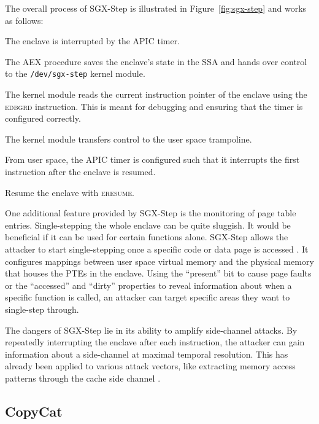\documentclass{llncs}
\begin{document}
The overall process of SGX-Step is illustrated in Figure~\ref{fig:sgx-step} and works as follows:
\begin{enumerate*}
  \item[\ding{172}]
    The enclave is interrupted by the APIC timer.
  \item[\ding{173}]
    The AEX procedure saves the enclave's state in the SSA
    and hands over control to the \texttt{/dev/sgx-step} kernel module.
  \item[\ding{174}]
    The kernel module reads the current instruction pointer of the enclave using the \textsc{edbgrd} instruction.
    This is meant for debugging and ensuring that the timer is configured correctly.
  \item[\ding{175}]
    The kernel module transfers control to the user space trampoline.
  \item[\ding{176}]
    From user space, the APIC timer is configured
    such that it interrupts the first instruction after the enclave is resumed.
  \item[\ding{177}]
    Resume the enclave with \textsc{eresume}.
\end{enumerate*}

One additional feature provided by SGX-Step is the monitoring of page table entries.
Single-stepping the whole enclave can be quite sluggish.
It would be beneficial if it can be used for certain functions alone.
SGX-Step allows the attacker to start single-stepping
once a specific code or data page is accessed \cite{BulckWKPS17}.
It configures mappings between user space virtual memory and
the physical memory that houses the PTEs in the enclave.
Using the ``present'' bit to cause page faults \cite{XuCP15} or
the ``accessed'' and ``dirty'' properties to reveal information about
when a specific function is called,
an attacker can target specific areas they want to single-step through.

The dangers of SGX-Step lie in its ability to amplify side-channel attacks.
By repeatedly interrupting the enclave after each instruction,
the attacker can gain information about a side-channel at maximal temporal resolution.
This has already been applied to various attack vectors,
like extracting memory access patterns through the cache side channel \cite{HahnelCP17}.

\subsection{CopyCat}
\end{document}
